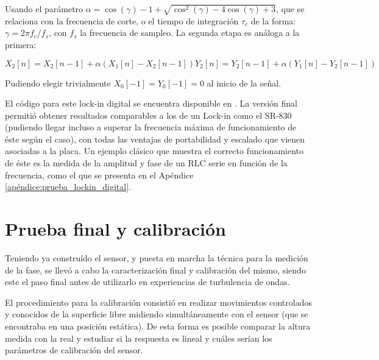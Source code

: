 Usando el parámetro $\alpha=\cos(\gamma)-1+\sqrt{\cos^2(\gamma)-4\cos(\gamma)+3}$, que se relaciona con la frecuencia de corte, o el tiempo de integración $\tau_c$ de la forma: $\gamma=2\pi f_c/f_s$, con $f_s$ la frecuencia de sampleo. La segunda etapa es análoga a la primera: %

\begin{subequations} 
	\begin{equation}
		X_2[n] = X_2[n-1] + \alpha(X_1[n]-X_2[n-1]) 
	\end{equation}
	\begin{equation}
		Y_2[n] = Y_2[n-1] + \alpha(Y_1[n]-Y_2[n-1]) 
	\end{equation}
\end{subequations}



Pudiendo  elegir trivialmente $X_0[-1]=Y_0[-1]=0$ al inicio de la señal. %



El código para este lock-in digital se encuentra disponible en \cite{ignacioph21_2026_18828835}. La versión final permitió obtener resultados comparables a los de un Lock-in como el SR-830 (pudiendo llegar incluso a superar la frecuencia máxima de funcionamiento de éste según el caso), con todas las ventajas de portabilidad y escalado que vienen asociadas a la placa. Un ejemplo clásico que muestra el correcto funcionamiento de éste es la medida de la amplitud y fase de un RLC serie en función de la frecuencia, como el que se presenta en el Apéndice \ref{apéndice:prueba_lockin_digital}.   %



\section{Prueba final y calibración} 
\label{sec:prueba_calibración} 
Teniendo ya construído el sensor, y puesta en marcha la técnica para la medición de la fase, se llevó a cabo la caracterización final y calibración del mismo, siendo este el paso final antes de utilizarlo en experiencias de turbulencia de ondas. 

El procedimiento para la calibración consistió en realizar movimientos controlados y conocidos de la superficie libre midiendo simultáneamente con el sensor (que se encontraba en una posición estática). De esta forma es posible comparar la altura medida con la real y estudiar si la respuesta es lineal y cuáles serían los parámetros de calibración del sensor.  


